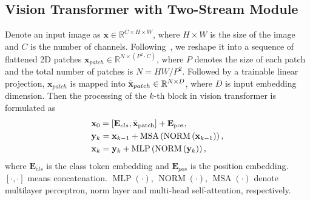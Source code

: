 \documentclass[letterpaper]{article} %
\begin{document}
\subsection{Vision Transformer with Two-Stream Module}
Denote an input image as $\mathbf{x} \in \mathbb{R}^{C \times H \times W}$, where $H\times W$ is the size of the image and $C$ is the number of channels. 
Following~\cite{vit}, we reshape it into a sequence of flattened 2D patches $\mathbf{x}_{patch} \in \mathbb{R}^{N \times\left(P^{2} \cdot C\right)}$, where $P$ denotes the size of each patch and the total number of patches is $N=H W / P^{2}$.
Followed by a trainable linear projection, $\mathbf{x}_{patch}$ is mapped into $\Bar{\mathbf{x}}_{patch} \in \mathbb{R}^{N \times D}$, where $D$ is input embedding dimension.
Then the processing of the $k$-th block in vision transformer is formulated as
\begin{equation}
\begin{aligned}
&\mathbf{x}_{0}=\left[\mathbf{E}_{cls}, \Bar{\mathbf{x}}_{\text {patch}}\right]+\mathbf{E}_{\text {pos}}, \\
&\mathbf{y}_{k}=\mathbf{x}_{k-1}+\operatorname{MSA}\left(\operatorname{NORM}\left(\mathbf{x}_{k-1}\right)\right), \\
&\mathbf{x}_{k}=\mathbf{y}_{k}+\operatorname{MLP}\left(\operatorname{NORM}\left(\mathbf{y}_{k}\right)\right),
\end{aligned}
\end{equation}
where $\mathbf{E}_{cls}$ is the class token embedding and $\mathbf{E}_{pos}$ is the position embedding. 
$\left[\cdot, \cdot\right]$ means concatenation.
$\operatorname{MLP}\left(\cdot\right)$, $\operatorname{NORM}\left(\cdot\right)$, $\operatorname{MSA}\left(\cdot\right)$ denote multilayer perceptron, norm layer and multi-head self-attention, respectively.
\end{document}
